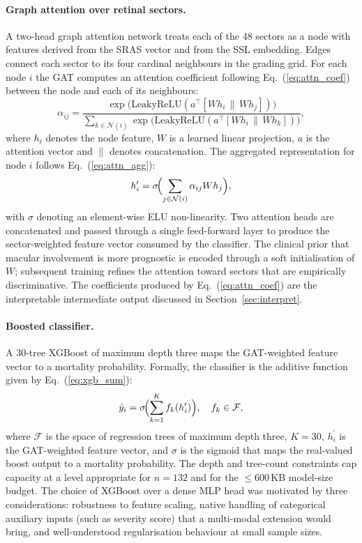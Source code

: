 \documentclass[twocolumn,10pt]{article}
\begin{document}
\paragraph{Graph attention over retinal sectors.}
A two-head graph attention network \cite{Velickovic2018} treats
each of the 48 sectors as a node with features derived from the
SRAS vector and from the SSL embedding. Edges connect each sector
to its four cardinal neighbours in the grading grid. For each
node $i$ the GAT computes an attention coefficient following
Eq.~(\ref{eq:attn_coef}) between the node and each of its
neighbours:
\begin{equation}
\alpha_{ij} = \frac{\exp\!\bigl(\mathrm{LeakyReLU}(a^{\top}[Wh_i\,\|\,Wh_j])\bigr)}
{\sum_{k\in\mathcal{N}(i)} \exp\!\bigl(\mathrm{LeakyReLU}(a^{\top}[Wh_i\,\|\,Wh_k])\bigr)},
\label{eq:attn_coef}
\end{equation}
where $h_i$ denotes the node feature, $W$ is a learned linear
projection, $a$ is the attention vector and $\|$ denotes
concatenation. The aggregated representation for node $i$
follows Eq.~(\ref{eq:attn_agg}):
\begin{equation}
h_i^{\prime} = \sigma\!\Bigl(\sum_{j\in\mathcal{N}(i)}\alpha_{ij}Wh_j\Bigr),
\label{eq:attn_agg}
\end{equation}
with $\sigma$ denoting an element-wise ELU non-linearity. Two
attention heads are concatenated and passed through a single
feed-forward layer to produce the sector-weighted feature vector
consumed by the classifier. The clinical prior that macular
involvement is more prognostic is encoded through a soft
initialisation of $W$; subsequent training refines the attention
toward sectors that are empirically discriminative. The
coefficients produced by Eq.~(\ref{eq:attn_coef}) are the
interpretable intermediate output discussed in
Section~\ref{sec:interpret}.

\paragraph{Boosted classifier.}
A 30-tree XGBoost of maximum depth three \cite{Chen2016} maps the
GAT-weighted feature vector to a mortality probability. Formally,
the classifier is the additive function given by
Eq.~(\ref{eq:xgb_sum}):
\begin{equation}
\hat{y}_i = \sigma\!\Bigl(\sum_{k=1}^{K} f_k(h_i^{\prime})\Bigr),
\quad f_k \in \mathcal{F},
\label{eq:xgb_sum}
\end{equation}
where $\mathcal{F}$ is the space of regression trees of maximum
depth three, $K = 30$, $h_i^{\prime}$ is the GAT-weighted feature
vector, and $\sigma$ is the sigmoid that maps the real-valued
boost output to a mortality probability. The depth and tree-count
constraints cap capacity at a level appropriate for $n=132$ and
for the $\leq 600$\,KB model-size budget. The choice of XGBoost
over a dense MLP head was motivated by three considerations:
robustness to feature scaling, native handling of categorical
auxiliary inputs (such as severity score) that a multi-modal
extension would bring, and well-understood regularisation
behaviour at small sample sizes.
\end{document}
